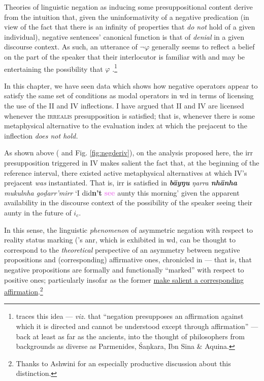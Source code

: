 Theories of linguistic negation as inducing some presuppositional content derive from the intuition that, given the uninformativity of a negative predication (in view of the fact that there is an infinity of properties that \textit{do not} hold of a given individual), negative sentences' canonical function is that of \textit{denial} in a given discourse context. As such, an utterance of $ \neg\varphi $ generally seems to reflect a belief on the part of the speaker that their interlocutor is familiar with and may be entertaining the possibility that $ \varphi $ \citep[see][70,109]{Givon1975}.\footnote{\citet[60--4]{Horn2001} traces this idea --- \textit{viz.} that ``negation presupposes an affirmation against which it is directed and cannot be understood except through affirmation'' --- back at least as far as the ancients, into the thought of philosophers from backgrounds as diverse as Parmenides, Śaṇkara, Ibn Sina \& Aquina.}


In this chapter, we have seen data which shows how negative operators appear to satisfy the same set of conditions as modal operators in \gls{wd} in terms of licensing the use of the \gls{II} and \gls{IV} inflections. I have argued that \gls{II} and \gls{IV} are licensed whenever the \textsc{irrealis} presupposition is satisfied; that is, whenever there is some metaphysical alternative to the evaluation index at which the prejacent to the inflection \textit{does not hold.} 


As shown above ( and Fig. \ref{fig:negderiv}), on the analysis proposed here, the \gls{irr} presupposition triggered in \gls{IV} makes salient the fact that, at the beginning of the reference interval, there existed active metaphysical alternatives at which \gls{IV}'s prejacent \textit{was} instantiated. That is, \gls{irr} is satisfied in \textit{\textbf{bäyŋu} ŋarra \textbf{nhänha} mukulnha goḏarr'mirr} `I did\textbf{n't} \textbf{\textcolor{violet}{see}} aunty this morning' given the apparent availability in the discourse context of the possibility of the speaker seeing their aunty in the future of $ i_c $.

In this sense, the linguistic \textit{phenomenon} of asymmetric negation with respect to reality status marking (\citeauthor{Miestamo2005}'s \acrshort{anr}, which is exhibited in \gls{wd}, can be thought to correspond to the \textit{theoretical} perspective of an asymmetry between negative propositions and (corresponding) affirmative ones, chronicled in \citet{Horn2001} --- that is, that negative propositions are formally and functionally ``marked'' with respect to positive ones; particularly insofar as the former \ul{make salient a corresponding affirmation}.\footnote{Thanks to Ashwini for an especially productive discussion about this distinction.}





